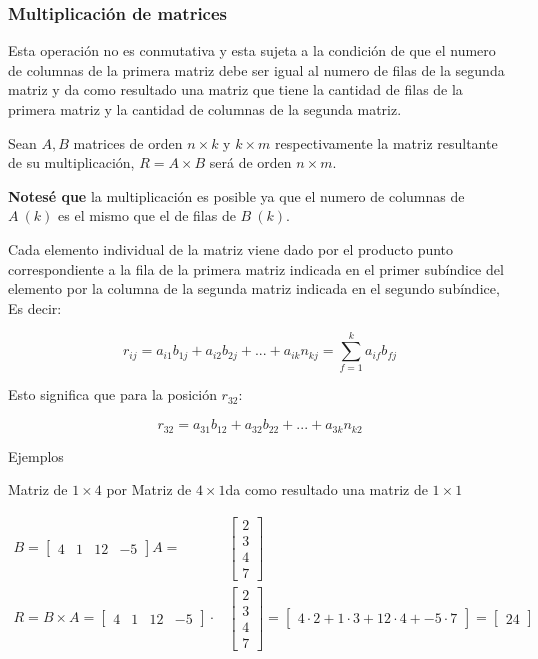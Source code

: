 \subsubsection{Multiplicación de matrices} \label{Multiplicaciondematrices}

Esta operación no es conmutativa y esta sujeta a la condición de que el
numero de columnas de la primera matriz debe ser igual al numero de filas de la
segunda matriz y da como resultado una matriz que tiene la cantidad de filas de
la primera matriz y la cantidad de columnas de la segunda matriz.


Sean $A,B$ matrices de orden $n\times k$ y $k\times m$ respectivamente
la matriz resultante de su multiplicación, $R=A\times B$ será de orden
$n\times m$.

\textbf{Notesé que} la multiplicación es posible ya que el numero de
columnas de $A\ (k)$ es el mismo que el de filas de $B\ (k)$.

Cada elemento individual de la matriz viene dado por el producto punto
correspondiente a la fila de la primera matriz indicada en el primer subíndice
del elemento por la columna de la segunda matriz indicada en el segundo
subíndice, Es decir:


$$ r_{ij}= a_{i1}b_{1j}+a_{i2}b_{2j}+...+a_{ik}n_{kj} = \sum_{f=1}^k{ a_{if}b_{fj} }  $$

Esto significa que para la posición $r_{32}$:

$$ r_{32}= a_{31}b_{12}+a_{32}b_{22}+...+a_{3k}n_{k2}   $$

Ejemplos

Matriz de $ 1\times4 $ por Matriz de $4\times1 $da como resultado una
matriz de $1\times1$

\begin{align*}
    B =
    \begin{bmatrix}
        4 & 1 & 12 & -5
    \end{bmatrix}
    A =
    &\begin{bmatrix}
        2 \\
        3\\
        4\\
        7
    \end{bmatrix}\\
    R = B\times A =
    \begin{bmatrix}
        4 & 1 & 12 & -5
    \end{bmatrix}  \cdot
    &\begin{bmatrix}
        2 \\
        3\\
        4\\
        7
    \end{bmatrix}
    =
    \begin{bmatrix}
        4\cdot2 + 1\cdot3 + 12\cdot4  + -5\cdot 7
    \end{bmatrix}
    =
    \begin{bmatrix}
        24
    \end{bmatrix}
\end{align*}

